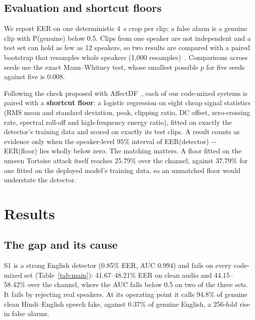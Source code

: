 \documentclass[conference]{IEEEtran}
\begin{document}
\subsection{Evaluation and shortcut floors}

We report EER on one deterministic 4~s crop per clip; a false alarm is a genuine clip with
P(genuine) below 0.5. Clips from one speaker are not
independent and a test set can hold as few as 12 speakers, so two results are compared
with a paired bootstrap that resamples whole speakers (1,000
resamples)~\cite{efron1993bootstrap}. Comparisons across seeds use the exact
Mann--Whitney test, whose smallest possible $p$ for five seeds against five is 0.008.

Following the check proposed with AffectDF~\cite{affectdf2026}, each of our code-mixed systems is paired
with a \textbf{shortcut floor}: a logistic regression on eight cheap signal statistics
(RMS mean and standard deviation, peak, clipping ratio, DC offset, zero-crossing rate,
spectral roll-off and high-frequency energy ratio), fitted on exactly the detector's
training data and scored on exactly its test clips. A result counts as evidence only when
the speaker-level 95\% interval of EER(detector) $-$ EER(floor) lies wholly below zero.
The matching matters. A floor fitted on the unseen Tortoise attack itself reaches 25.79\%
over the channel, against 37.79\% for one fitted on the deployed model's training data,
so an unmatched floor would understate the detector.

\section{Results}

\subsection{The gap and its cause}

S1 is a strong English detector (0.85\% EER, AUC 0.994) and fails on every code-mixed set
(Table~\ref{tab:main}): 41.67--48.21\% EER on clean audio and 44.15--58.42\% over the
channel, where the AUC falls below 0.5 on two of the three sets. It fails by rejecting real
speakers. At its operating point it calls 94.8\% of genuine clean Hindi--English speech
fake, against 0.37\% of
genuine English, a 256-fold rise in false alarms.
\end{document}
